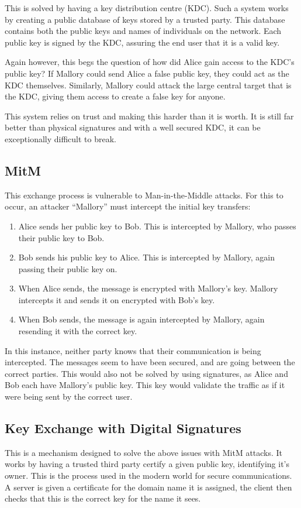 		This is solved by having a key distribution centre (KDC). 
		Such a system works by creating a public database of keys stored by a trusted party.
		This database contains both the public keys and names of individuals on the network. 
		Each public key is signed by the KDC, assuring the end user that it is a valid key. 

		Again however, this begs the question of how did Alice gain access to the KDC's public key?
		If Mallory could send Alice a false public key, they could act as the KDC themselves. 
		Similarly, Mallory could attack the large central target that is the KDC, giving them access to create a false key for anyone. 

		This system relies on trust and making this harder than it is worth. 
		It is still far better than physical signatures and with a well secured KDC, it can be exceptionally difficult to break. 

		\subsection{MitM}
			This exchange process is vulnerable to Man-in-the-Middle attacks. 
			For this to occur, an attacker ``Mallory'' must intercept the initial key transfers:
			\begin{enumerate}
				\item Alice sends her public key to Bob. This is intercepted by Mallory, who passes their public key to Bob. 
				\item Bob sends his public key to Alice. This is intercepted by Mallory, again passing their public key on. 
				\item When Alice sends, the message is encrypted with Mallory's key. 
					Mallory intercepts it and sends it on encrypted with Bob's key. 
				\item When Bob sends, the message is again intercepted by Mallory, again resending it with the correct key. 
			\end{enumerate}

			In this instance, neither party knows that their communication is being intercepted. 
			The messages seem to have been secured, and are going between the correct parties. 
			This would also not be solved by using signatures, as Alice and Bob each have Mallory's public key. 
			This key would validate the traffic as if it were being sent by the correct user. 

		\subsection{Key Exchange with Digital Signatures}
			This is a mechanism designed to solve the above issues with MitM attacks. 
			It works by having a trusted third party certify a given public key, identifying it's owner. 
			This is the process used in the modern world for secure communications. 
			A server is given a certificate for the domain name it is assigned, the client then checks that this is the correct key for the name it sees. 

